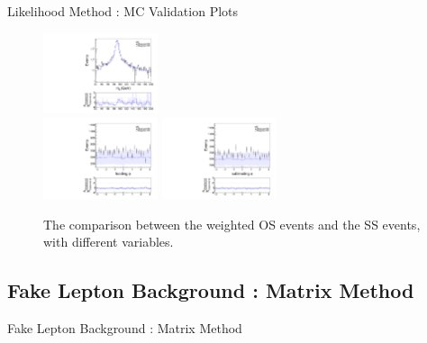 \documentclass[mathserif,serif]{beamer}
\begin{document}
\begin{frame}{Likelihood Method : MC Validation Plots}
\begin{figure}
\centering
\includegraphics[width=0.3\textwidth]{data/plot/charge_flip/ReweightPlots/plots_NOchfSF/mc_mll.pdf} \\
\includegraphics[width=0.3\textwidth]{data/plot/charge_flip/ReweightPlots/plots_NOchfSF/mc_phi_1.pdf}
\includegraphics[width=0.3\textwidth]{data/plot/charge_flip/ReweightPlots/plots_NOchfSF/mc_phi_2.pdf}
\caption{The comparison between the weighted OS events and the SS events, with different variables.}
\end{figure}
\end{frame}

\subsection{Fake Lepton Background : Matrix Method}
\begin{frame}
\begin{center}
\huge
Fake Lepton Background : Matrix Method
\end{center}
\end{frame}
\end{document}
